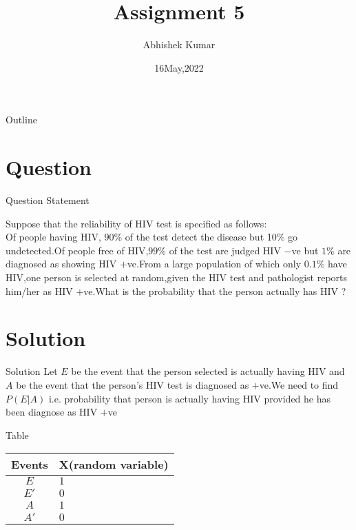 \documentclass{beamer}
\title{Assignment 5}
\author{Abhishek Kumar}
\institute{IIT Hyderabad}
\date{16May,2022}
\begin{document}
	\begin{frame}
		\titlepage
	\end{frame}
	\begin{frame}{Outline}
		\tableofcontents
	\end{frame}
	\section{Question}
	\begin{frame}{Question Statement}
		
		\textbf{}Suppose that the reliability of HIV test is specified as follows:\\
		Of people having HIV, $90$\% of the test detect the disease but 10\% go undetected.Of people free of HIV,$99$\% of the test are judged HIV $-$ve but $1$\% are diagnosed as showing HIV $+$ve.From a large population of which only $0.1$\% have HIV,one person is selected at random,given the HIV test and pathologist reports him/her as HIV $+$ve.What is the probability that the person actually has HIV ?\\
	\end{frame}
	\section{Solution}
	\begin{frame}{Solution}
		\textbf{}
		Let $E$ be the event that the person selected is actually having HIV and $A$ be the event that the person's HIV test is diagnosed as $+$ve.We need to find $P(E|A)$ i.e. probability that person is actually having HIV provided he has been diagnose as HIV $+$ve
		\begin{block}{Table}
			\begin{tabular}{|c||l|}
				\hline
				Events & X(random variable)  \\ 
				\hline
				$E$ & $1$ \\ 
				\hline
				$E'$ & $0$ \\ 
				\hline
				$A$ & $1$ \\ 
				\hline
				$A'$ & $0$ \\ 
				\hline
			\end{tabular}
			
		\end{block}
	\end{frame}
	
\end{document}
